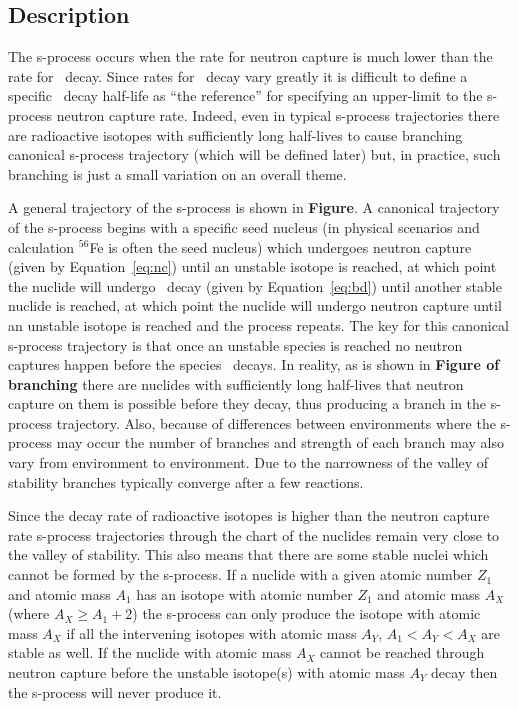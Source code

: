 \label{sec:s}
\subsection{Description}
The s-process occurs when
the rate for neutron capture is much lower than the rate
for \bminus\ decay.  Since rates for \bminus\ decay vary greatly
it is difficult to define a specific \bminus\ decay half-life as ``the
reference'' for specifying an upper-limit to the s-process neutron
capture rate.  Indeed, even in typical
s-process trajectories there are radioactive isotopes with
sufficiently long half-lives to cause branching canonical s-process
trajectory (which will be defined later) but, in practice, such
branching is just a small variation on an overall theme.  

A general trajectory of the s-process is shown in {\bf Figure}.  A
canonical trajectory of the s-process begins with a specific seed
nucleus (in physical scenarios and calculation $^{56}$Fe is often the
seed nucleus) which undergoes neutron capture (given by
Equation~\ref{eq:nc}) until an unstable isotope is reached, at which
point the nuclide will undergo \bminus\ decay (given by
Equation~\ref{eq:bd}) until another stable nuclide is reached, at
which point the nuclide will undergo neutron capture until an unstable
isotope is reached and the process repeats.  The key for this
canonical s-process trajectory is that once an unstable species is
reached no neutron captures happen before the species \bminus\
decays.  In reality, as is shown in {\bf Figure of branching} there
are nuclides with sufficiently long half-lives that neutron capture on
them is possible before they decay, thus producing a branch in the
s-process trajectory.  Also, because of differences between
environments where the s-process may occur the number of branches and
strength of each branch may also vary from environment to
environment.  Due to the narrowness of the valley of stability
branches typically converge after a few reactions.

Since the decay rate of radioactive isotopes is higher than the
neutron capture rate s-process trajectories through the chart of the
nuclides remain very close to the valley of stability.  This also
means that there are some stable nuclei which cannot be formed by the
s-process.  If a nuclide with a given atomic number $Z_1$ and atomic
mass $A_1$ has an isotope with atomic number $Z_1$ and atomic mass
$A_X$ (where $A_X \geq A_1 +2$) the s-process can only produce the
isotope with atomic mass $A_X$ if all the intervening isotopes with
atomic mass $A_Y$, $A_1 < A_Y < A_X$ are stable as well.  If the
nuclide with atomic mass $A_X$ cannot be reached through neutron
capture before the unstable isotope(s) with atomic mass $A_Y$ decay
then the s-process will never produce it.


